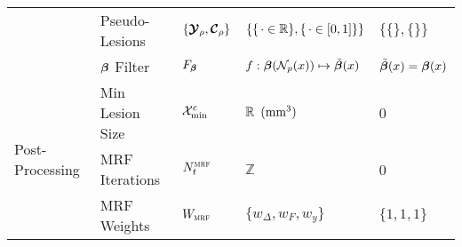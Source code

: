 \begin{table}
\begin{tabular}{lllll}
                                     & Pseudo-Lesions       & $\{\bm{\mathcal{Y}}_{\rho},\bm{\mathcal{C}}_{\rho}\}$ & $\{\{\thinspace\cdot\in\mathbb{R}\},\{\thinspace\cdot\in[0,1]\}\}$ & $\{\{\},\{\}\}$           \\
                                     & $\bm{\beta}$ Filter         & $F_{\bm{\beta}}$                   & $f: \bm{\beta}(\mathcal{N}_p(x)) \mapsto \tilde{\bm{\beta}}(x)$      & $\tilde{\bm{\beta}}(x) = \bm{\beta}(x)$ \\ \hline
    \multirow{3}{*}{Post-Processing} & Min Lesion  Size     & $\mathcal{X}_{\min}^{c}$             & $\mathbb{R}\enspace(\text{mm}^{3})$                       & 0                         \\
                                     & MRF Iterations       & $N_{t}^{\textsc{mrf}}$              & $\mathbb{Z}$                                  & 0                         \\
                                     & MRF Weights          & $W_{\textsc{mrf}}$                  & $\{w_{\Delta},w_{F},w_y\}$                    & $\{1,1,1\}$               \\ \hline
  \end{tabular}
\end{table}
